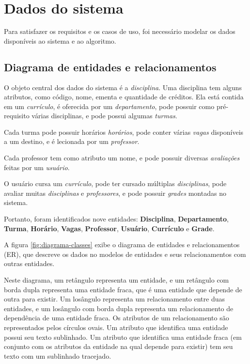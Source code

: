 \chapter{Dados do sistema}
\label{cha:Dados do sistema}

Para satisfazer os requisitos e os casos de uso, foi necessário modelar os dados disponíveis ao sistema e ao algoritmo.

\section{Diagrama de entidades e relacionamentos}

O objeto central dos dados do sistema é a \textit{disciplina}. Uma disciplina tem alguns atributos, como código, nome, ementa e quantidade de créditos. Ela está contida em um \textit{currículo}, é oferecida por um \textit{departamento}, pode possuir como pré-requisito várias disciplinas, e pode possui algumas \textit{turmas}.

Cada turma pode possuir horários \textit{horários}, pode conter várias \textit{vagas} disponíveis a um destino, e é lecionada por um \textit{professor}.

Cada professor tem como atributo um nome, e pode possuir diversas \textit{avaliações} feitas por um \textit{usuário}.

O usuário cursa um \textit{currículo}, pode ter cursado múltiplas \textit{disciplinas}, pode avaliar muitas \textit{disciplinas} e \textit{professores}, e pode possuir \textit{grades} montadas no sistema.

Portanto, foram identificados nove entidades: \textbf{Disciplina}, \textbf{Departamento}, \textbf{Turma}, \textbf{Horário}, \textbf{Vagas}, \textbf{Professor}, \textbf{Usuário}, \textbf{Currículo} e \textbf{Grade}.

A figura \ref{fig:diagrama-classes} exibe o diagrama de entidades e relacionamentos (ER), que descreve os dados no modelos de entidades e seus relacionamentos com outras entidades.

Neste diagrama, um retângulo representa um entidade, e um retângulo com borda dupla representa uma entidade fraca, que é uma entidade que depende de outra para existir. Um losângulo representa um relacionamento entre duas entidades, e um losângulo com borda dupla representa um relacionamento de dependência de uma entidade fraca. Os atributos de um relacionamento são representados pelos círculos ovais. Um atributo que identifica uma entidade possui seu texto sublinhado. Um atributo que identifica uma entidade fraca (em conjunto com os atributos da entidade na qual depende para existir) tem seu texto com um sublinhado tracejado.

